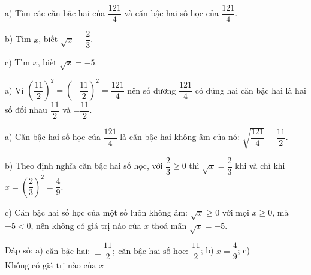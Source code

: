\begin{problem}[9DS-CAN-011]
a) Tìm các căn bậc hai của $\dfrac{121}{4}$ và căn bậc hai số học của $\dfrac{121}{4}$.

b) Tìm $x$, biết $\sqrt{x} = \dfrac{2}{3}$.

c) Tìm $x$, biết $\sqrt{x} = -5$.

\begin{solution}
a) Vì $\left(\dfrac{11}{2}\right)^2 = \left(-\dfrac{11}{2}\right)^2 = \dfrac{121}{4}$ nên số dương $\dfrac{121}{4}$ có đúng hai căn bậc hai là hai số đối nhau $\dfrac{11}{2}$ và $-\dfrac{11}{2}$.

a) Căn bậc hai số học của $\dfrac{121}{4}$ là căn bậc hai không âm của nó: $\sqrt{\dfrac{121}{4}} = \dfrac{11}{2}$.

b) Theo định nghĩa căn bậc hai số học, với $\dfrac{2}{3} \geq 0$ thì $\sqrt{x} = \dfrac{2}{3}$ khi và chỉ khi $x = \left(\dfrac{2}{3}\right)^2 = \dfrac{4}{9}$.

c) Căn bậc hai số học của một số luôn không âm: $\sqrt{x} \geq 0$ với mọi $x \geq 0$, mà $-5 < 0$, nên không có giá trị nào của $x$ thoả mãn $\sqrt{x} = -5$.

Đáp số: a) $\boxed{\text{căn bậc hai: } \pm\dfrac{11}{2};\ \text{căn bậc hai số học: } \dfrac{11}{2}}$; b) $\boxed{x = \dfrac{4}{9}}$; c) $\boxed{\text{Không có giá trị nào của } x}$
\end{solution}
\end{problem}

